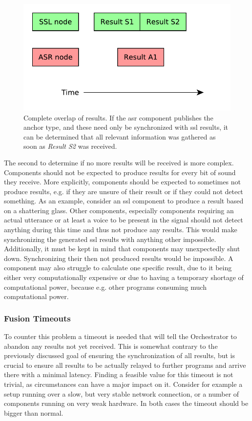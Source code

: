 \begin{figure}[]
	\centering
	\includegraphics[width=.66\textwidth]{diagrams/main_orc_all_results.pdf}
	\caption{Complete overlap of results.
		If the \gls{asr} component publishes the anchor type, and these need only be synchronized with \gls{ssl} results, it can be determined that all relevant information was gathered as soon as \textit{Result S2} was received.}
	\label{pic:main:orc:all_results}
\end{figure}

The second to determine if no more results will be received is more complex.
Components should not be expected to produce results for every bit of sound they receive.
More explicitly, components should be expected to sometimes not produce results, e.g. if they are unsure of their result or if they could not detect something.
As an example, consider an \gls{ssl} component to produce a result based on a shattering glass.
Other components, especially components requiring an actual utterance or at least a voice to be present in the signal should not detect anything during this time and thus not produce any results.
This would make synchronizing the generated \gls{ssl} results with anything other impossible. 
Additionally, it must be kept in mind that components may unexpectedly shut down.
Synchronizing their then not produced results would be impossible.
A component may also struggle to calculate one specific result, due to it being either very computationally expensive or due to having a temporary shortage of computational power, because e.g. other programs consuming much computational power.

\subsubsection{Fusion Timeouts}
To counter this problem a timeout is needed that will tell the Orchestrator to abandon any results not yet received.
This is somewhat contrary to the previously discussed goal of ensuring the synchronization of all results, but is crucial to ensure all results to be actually relayed to further programs and arrive there with a minimal latency.
Finding a feasible value for this timeout is not trivial, as circumstances can have a major impact on it.
Consider for example a setup running over a slow, but very stable network connection, or a number of components running on very weak hardware.
In both cases the timeout should be bigger than normal.


